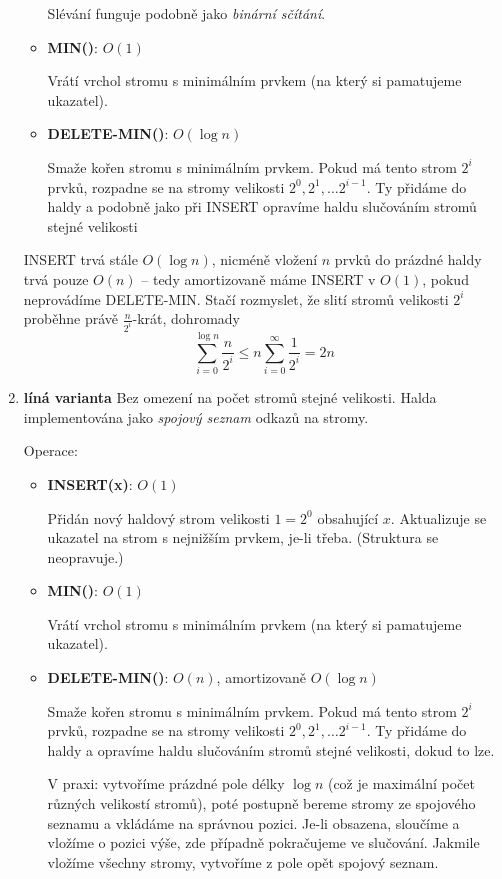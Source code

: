 \documentclass[11pt]{report} %
\numberwithin{equation}{section}
\begin{document}
\begin{enumerate}
\begin{itemize}
		Slévání funguje podobně jako \textit{binární sčítání}.
		
		\item \textbf{MIN()}: $O(1)$
		
		Vrátí vrchol stromu s minimálním prvkem (na který si pamatujeme ukazatel).
		
		\item \textbf{DELETE-MIN()}: $O(\log n)$
		
		Smaže kořen stromu s minimálním prvkem. Pokud má tento strom $2^i$ prvků, rozpadne se na stromy velikosti $2^0, 2^1, \dots 2^{i-1}$. Ty přidáme do haldy a podobně jako při INSERT opravíme haldu slučováním stromů stejné velikosti
	\end{itemize}
	
	INSERT trvá stále $O(\log n)$, nicméně vložení $n$ prvků do prázdné haldy trvá pouze $O(n)$ -- tedy amortizovaně máme INSERT v $O(1)$, pokud neprovádíme DELETE-MIN. Stačí rozmyslet, že slití stromů velikosti $2^i$ proběhne právě $\frac{n}{2^i}$-krát, dohromady
	$$\sum\limits_{i=0}^{\log n} \frac{n}{2^i} \leq n \sum\limits_{i = 0}^{\infty}\frac{1}{2^i} = 2n$$
	
	\item \textbf{líná varianta} Bez omezení na počet stromů stejné velikosti. Halda implementována jako \textit{spojový seznam} odkazů na stromy.

	Operace:
	\begin{itemize}
		
		
		\item \textbf{INSERT(x)}: $O(1)$
		
		Přidán nový haldový strom velikosti $1 = 2^0$ obsahující $x$. Aktualizuje se ukazatel na strom s nejnižším prvkem, je-li třeba. (Struktura se neopravuje.)
		

		\item \textbf{MIN()}: $O(1)$
		
		Vrátí vrchol stromu s minimálním prvkem (na který si pamatujeme ukazatel).
		
		\item \textbf{DELETE-MIN()}: $O(n)$, amortizovaně $O(\log n)$
		
		Smaže kořen stromu s minimálním prvkem. Pokud má tento strom $2^i$ prvků, rozpadne se na stromy velikosti $2^0, 2^1, \dots 2^{i-1}$. Ty přidáme do haldy a opravíme haldu slučováním stromů stejné velikosti, dokud to lze.
		
		V praxi: vytvoříme prázdné pole délky $\log n$ (což je maximální počet různých velikostí stromů), poté postupně bereme stromy ze spojového seznamu a vkládáme na správnou pozici. Je-li obsazena, sloučíme a vložíme o pozici výše, zde případně pokračujeme ve slučování. Jakmile vložíme všechny stromy, vytvoříme z pole opět spojový seznam.
	\end{itemize}


\end{enumerate}
\end{document}
